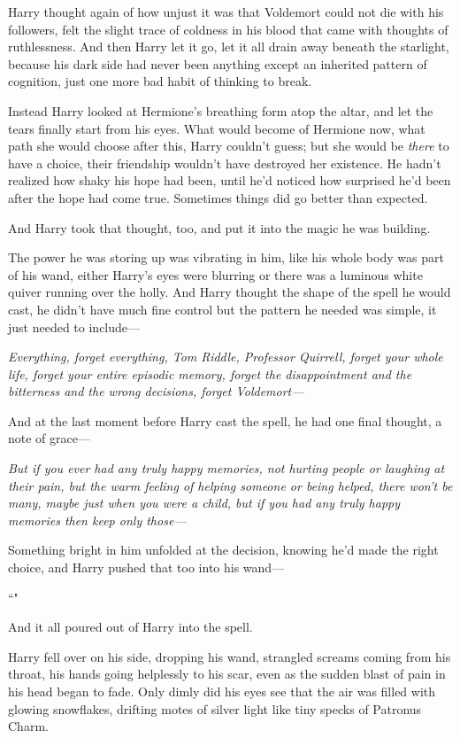 Harry thought again of how unjust it was that Voldemort could not die with his followers, felt the slight trace of coldness in his blood that came with thoughts of ruthlessness. And then Harry let it go, let it all drain away beneath the starlight, because his dark side had never been anything except an inherited pattern of cognition, just one more bad habit of thinking to break.

Instead Harry looked at Hermione's breathing form atop the altar, and let the tears finally start from his eyes. What would become of Hermione now, what path she would choose after this, Harry couldn't guess; but she would be \emph{there} to have a choice, their friendship wouldn't have destroyed her existence. He hadn't realized how shaky his hope had been, until he'd noticed how surprised he'd been after the hope had come true. Sometimes things did go better than expected.

And Harry took that thought, too, and put it into the magic he was building.

The power he was storing up was vibrating in him, like his whole body was part of his wand, either Harry's eyes were blurring or there was a luminous white quiver running over the holly. And Harry thought the shape of the spell he would cast, he didn't have much fine control but the pattern he needed was simple, it just needed to include—

\emph{Everything, forget everything, Tom Riddle, Professor Quirrell, forget your whole life, forget your entire episodic memory, forget the disappointment and the bitterness and the wrong decisions, forget Voldemort—}

And at the last moment before Harry cast the spell, he had one final thought, a note of grace—

\emph{But if you ever had any truly happy memories, not hurting people or laughing at their pain, but the warm feeling of helping someone or being helped, there won't be many, maybe just when you were a child, but if you had any truly happy memories then keep only those—}

Something bright in him unfolded at the decision, knowing he'd made the right choice, and Harry pushed that too into his wand—

``\emph{}"

And it all poured out of Harry into the spell.

Harry fell over on his side, dropping his wand, strangled screams coming from his throat, his hands going helplessly to his scar, even as the sudden blast of pain in his head began to fade. Only dimly did his eyes see that the air was filled with glowing snowflakes, drifting motes of silver light like tiny specks of Patronus Charm.

